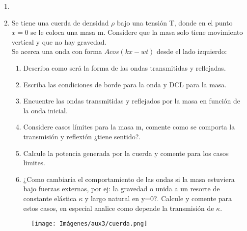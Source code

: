 \documentclass[letterpaper,11pt]{article}
\begin{document}
\vspace{-1cm}
\begin{enumerate}\setlength{\itemsep}{0.4cm}


\item[]

\item Se tiene una cuerda de densidad $\rho$ bajo una tensión T, donde en el punto $x=0$ se le coloca una masa m. Considere que la masa solo tiene movimiento vertical y que no hay gravedad.\\
Se acerca una onda con forma $A cos(kx-wt)$ desde el lado izquierdo:
    \begin{enumerate}
         \item Describa como será la forma de las ondas transmitidas y reflejadas. \\
         
        \item Escriba las condiciones de borde para la onda y DCL para la masa.  \\

        \item Encuentre las ondas transmitidas y reflejados por la masa en función de la onda inicial. \\

        \item Considere casos límites para la masa m, comente como se comporta la transmisión y reflexión ¿tiene sentido?.\\
        
        \item Calcule la potencia generada por la cuerda y comente para los casos limites. \\

        \item ¿Como cambiaría el comportamiento de las ondas si la masa estuviera bajo fuerzas externas, por ej: la gravedad o unida a un resorte de constante elástica $\kappa$ y largo natural en y=0?. Calcule y comente para estos casos, en especial analice como depende la transmisión de $\kappa$.
        
    \end{enumerate}
    
    \begin{figure}[h]
        \centering
        \texttt{[image: Imágenes/aux3/cuerda.png]}
        \label{fig:my_label}
    \end{figure}
    

\end{enumerate}
\end{document}
